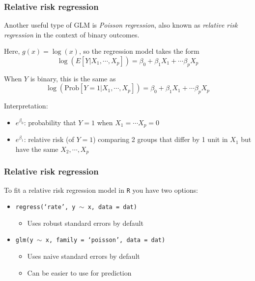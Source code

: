\documentclass[12pt, 
hyperref={colorlinks=true, linkcolor=blue, urlcolor=cyan}]{beamer}
\begin{document}
\begin{frame}
\frametitle{Relative risk regression}

Another useful type of GLM is \textit{Poisson regression}, also known as \textit{relative risk regression} in the context of binary outcomes.

Here, $g(x) = \log(x)$, so the regression model takes the form $$\log\left(E[Y|X_1,\cdots,X_p]\right) = \beta_0 + \beta_1 X_1 + \cdots \beta_pX_p$$ \pause

When $Y$ is binary, this is the same as $$\log\left(\text{Prob}[Y=1|X_1,\cdots,X_p]\right) = \beta_0 + \beta_1 X_1 + \cdots \beta_pX_p$$ \pause

\vspace{-0.1cm}
Interpretation:\vspace{-0.3cm}
\begin{itemize}
\item $e^{\beta_0}$: probability that $Y=1$ when $X_1 = \cdots X_p = 0$ \pause
\item $e^{\beta_1}$: relative risk (of $Y=1$) comparing 2 groups that differ by 1 unit in $X_1$ but have the same $X_2, \cdots, X_p$
\end{itemize} 

\end{frame}


\begin{frame}
\frametitle{Relative risk regression}

To fit a relative risk regression model in \texttt{R} you have two options:

\begin{itemize}
\item \texttt{regress(`rate', y $\sim$ x, data = dat)}
	\begin{itemize}
	\item Uses robust standard errors by default
	\end{itemize}
\item \texttt{glm(y $\sim$ x, family = `poisson', data = dat)}
	\begin{itemize}
	\item Uses naive standard errors by default
	\item Can be easier to use for prediction
	\end{itemize}
\end{itemize}


\end{frame}
\end{document}
